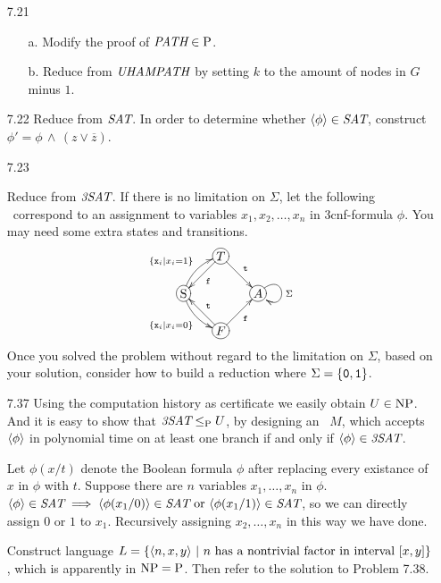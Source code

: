 \begin{itemize}
	\item[7.21]
	\begin{itemize}
		\item[a.] Modify the proof of $\textit{PATH} \in \Poly$.
		\item[b.] Reduce from $\IT{UHAMPATH}$ by setting $k$ to the amount of nodes in $G$ minus $1$.
	\end{itemize}

	\item[7.22]
	Reduce from $\IT{SAT}$. In order to determine whether $\Bra{\phi} \in \IT{SAT}$, construct $\phi' = \phi \,\wedge\,(z \vee \overline{z})$.
	
	\item[7.23]
	\Omit
	
	\item[\Star 7.36] 
	Reduce from $\IT{3SAT}$. If there is no limitation on $\Sigma$, let the following \DFA\ correspond to an assignment to variables $x_1, x_2, \dots, x_n$ in 3cnf-formula $\phi$. You may need some extra states and transitions.
	$$
		\xymatrix@ur@R=2pc@C=2pc{
			*+[o][F-]{\RM{S}} \ar@/^/[r]^{\{ \TT{x}_i | x_i = 1 \}} \ar@/_/[d]_{\{ \TT{x}_i | x_i = 0 \}} &
			*+[o][F-]{T} \ar^{\TT{t}}[d] \ar^{\TT{f}}[l] \\
			*+[o][F-]{F} \ar_{\TT{f}}[r] \ar_{\TT{t}}[u] & 
			*+[o][F-]{A} \ar@(ur,rd)[]^{\Sigma}
		}
	$$
	Once you solved the problem without regard to the limitation on $\Sigma$, based on your solution, consider how to build a reduction where $\Sigma = \{ \TT{0}, \TT{1} \}$.
	
	\item[7.37]
	Using the computation history as certificate we easily obtain $U \in \NPoly$. And it is easy to show that $\IT{3SAT} \LeqP U$, by designing an \NTM\ $M$, which accepts $\Bra{\phi}$ in polynomial time on at least one branch if and only if $\Bra{\phi} \in \IT{3SAT}$.
	
	\item[\Star 7.38]
	Let $\phi(x/t)$ denote the Boolean formula $\phi$ after replacing every existance of $x$ in $\phi$ with $t$. Suppose there are $n$ variables $x_1, \dots, x_n$ in $\phi$. $\Bra{\phi} \in \IT{SAT} \implies \Bra{\phi(x_1/0)} \in \IT{SAT} \text{ or } \Bra{\phi(x_1/1)} \in \IT{SAT}$, so we can directly assign $0$ or $1$ to $x_1$. Recursively assigning $x_2, \dots, x_n$ in this way we have done.
	
	\item[\Star 7.39]
	Construct language $L = \{ \Bra{n, x, y} \ | \ \text{$n$ has a nontrivial factor in interval $[x, y]$} \}$, which is apparently in $\NPoly = \Poly$. Then refer to the solution to Problem 7.38.
	

\end{itemize}
